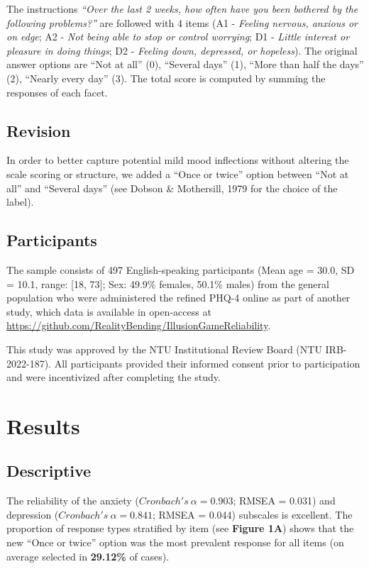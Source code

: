\documentclass[
  man,floatsintext]{apa6}
\begin{document}
The instructions \emph{``Over the last 2 weeks, how often have you been bothered by the following problems?''} are followed with 4 items (A1 - \emph{Feeling nervous, anxious or on edge}; A2 - \emph{Not being able to stop or control worrying}; D1 - \emph{Little interest or pleasure in doing things}; D2 - \emph{Feeling down, depressed, or hopeless}). The original answer options are ``Not at all'' (0), ``Several days'' (1), ``More than half the days'' (2), ``Nearly every day'' (3). The total score is computed by summing the responses of each facet.

\hypertarget{revision}{%
\subsection{Revision}\label{revision}}

In order to better capture potential mild mood inflections without altering the scale scoring or structure, we added a ``Once or twice'' option between ``Not at all'' and ``Several days'' (see Dobson \& Mothersill, 1979 for the choice of the label).

\hypertarget{participants}{%
\subsection{Participants}\label{participants}}

The sample consists of 497 English-speaking participants (Mean age = 30.0, SD = 10.1, range: {[}18, 73{]}; Sex: 49.9\% females, 50.1\% males) from the general population who were administered the refined PHQ-4 online as part of another study, which data is available in open-access at \url{https://github.com/RealityBending/IllusionGameReliability}.

This study was approved by the NTU Institutional Review Board (NTU IRB-2022-187). All participants provided their informed consent prior to participation and were incentivized after completing the study.

\hypertarget{results}{%
\section{Results}\label{results}}

\hypertarget{descriptive}{%
\subsection{Descriptive}\label{descriptive}}

The reliability of the anxiety (\(Cronbach's~\alpha = 0.903\); RMSEA = 0.031) and depression (\(Cronbach's~\alpha = 0.841\); RMSEA = 0.044) subscales is excellent. The proportion of response types stratified by item (see \textbf{Figure 1A}) shows that the new ``Once or twice'' option was the most prevalent response for all items (on average selected in \textbf{29.12\%} of cases).
\end{document}
